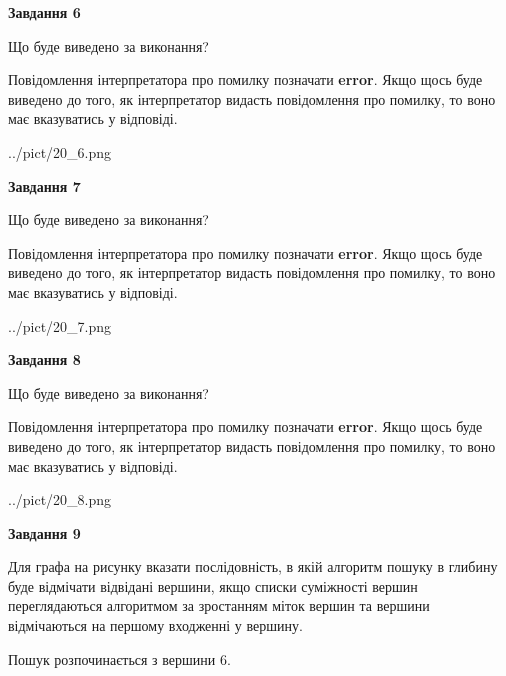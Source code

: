 \documentclass[12pt, ukrainian]{article}
\begin{document}
{\begin {large}
{\begin {center}\textbf{Завдання 6}\end {center}}\par
Що буде виведено за виконання?

Повідомлення інтерпретатора про помилку позначати \textbf{error}.
Якщо щось буде виведено до того, як інтерпретатор видасть повідомлення про помилку, 
то воно має вказуватись у відповіді. \par


\begin{center}
	{../pict/20_6.png}
\end{center}
\newpage

{\begin {center}\textbf{Завдання 7}\end {center}}\par
Що буде виведено за виконання?

Повідомлення інтерпретатора про помилку позначати \textbf{error}.
Якщо щось буде виведено до того, як інтерпретатор видасть повідомлення про помилку, 
то воно має вказуватись у відповіді. \par


\begin{center}
	{../pict/20_7.png}
\end{center}
\newpage

{\begin {center}\textbf{Завдання 8}\end {center}}\par
Що буде виведено за виконання?

Повідомлення інтерпретатора про помилку позначати \textbf{error}.
Якщо щось буде виведено до того, як інтерпретатор видасть повідомлення про помилку, 
то воно має вказуватись у відповіді. \par


\begin{center}
	{../pict/20_8.png}
\end{center}
\newpage

{\begin {center}\textbf{Завдання 9}\end {center}}\par
Для графа на рисунку вказати послідовність, в якій алгоритм пошуку в глибину буде відмічати відвідані вершини, якщо списки суміжності вершин переглядаються алгоритмом за зростанням міток вершин та вершини відмічаються на першому вход\-женні у вершину.\par
Пошук розпочинається з вершини 6.\par


\end{large}}
\end{document}
